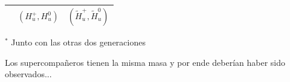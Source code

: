 \documentclass[10pt, compress,spanish]{beamer}
\begin{document}
\begin{frame}[fragile]
\begin{table}
{\begin{tabular}{ P{4cm} | P{4cm} | P{4cm} }
                    & $(H^{+}_{u},H^{0}_{u})$ & $(\widetilde{H}^{+}_{u},\widetilde{H}^{0}_{u})$ \\

  \hline
  \hline
\end{tabular}}
\end{table}

\renewcommand{\arraystretch}{1}

\footnotesize{$^{*}$ Junto con las otras dos generaciones}

\begin{block}{\normalsize Los supercompañeros tienen la misma masa y por ende deberían haber sido observados...}
\end{block}

\end{frame}




\end{document}
